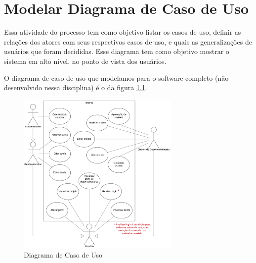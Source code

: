 \chapter{Modelar Diagrama de Caso de Uso}

Essa atividade do processo tem como objetivo listar os casos de uso, definir as relações dos atores com seus respectivos casos de uso, e quais as generalizações de usuários que foram decididas. Esse diagrama tem como objetivo mostrar o sistema em alto nível, no ponto de vista dos usuários.

O diagrama de caso de uso que modelamos para o software completo (não desenvolvido nessa disciplina) é o da figura \ref{fig:diagrama-caso-uso}.

\begin{figure}[H]
  \center
  \includegraphics[width=0.7\textwidth]{figuras/diagrama-caso-uso.png}
  \caption{Diagrama de Caso de Uso}
  \label{fig:diagrama-caso-uso}
\end{figure}
